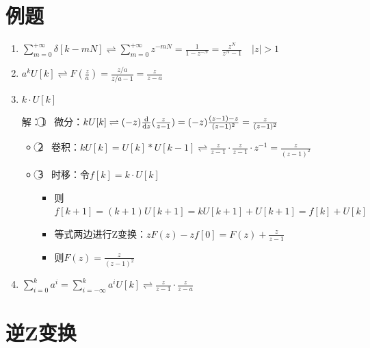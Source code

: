 \documentclass[UTF8]{ctexart}
\begin{document}
\section{例题}
\begin{enumerate}[label=(\arabic*),itemindent=0pt,labelindent=\parindent,labelwidth=2em,labelsep=5pt,leftmargin=*]
  \item $\sum_{m=0}^{+\infty}\delta[k-mN]\rightleftharpoons\sum_{m=0}^{+\infty}z^{-mN}=\frac{1}{1-z^{-N}}=\frac{z^N}{z^N-1}\quad |z|>1$
  \item $a^kU[k]\rightleftharpoons F(\frac{z}{a})=\frac{z/a}{z/a-1}=\frac{z}{z-a}$
  \item $k\cdot U[k]$ \par
        解：\textcircled{1} \ 微分：$kU[k]\rightleftharpoons(-z)\frac{{\rm d}}{{\rm d}z}(\frac{z}{z-1})=(-z)\frac{(z-1)-z}{(z-1)^2}=\frac{z}{(z-1)^2}$
        \begin{itemize}[label=,left=1.5em]
          \item \textcircled{2} \ 卷积：$kU[k]=U[k]*U[k-1]\rightleftharpoons\frac{z}{z-1}\cdot\frac{z}{z-1}\cdot z^{-1}=\frac{z}{(z-1)^2}$
          \item \textcircled{3} \ 时移：令$f[k]=k\cdot U[k]$
                \begin{itemize}[label=,left=4.2em]
                  \item 则$f[k+1]=(k+1)U[k+1]=kU[k+1]+U[k+1]=f[k]+U[k]$
                  \item 等式两边进行Z变换：$zF(z)-zf[0]=F(z)+\frac{z}{z-1}$
                  \item 则$F(z)=\frac{z}{(z-1)^2}$
                \end{itemize}
        \end{itemize}
  \item $\sum_{i=0}^{k}a^i=\sum_{i=-\infty}^{k}a^iU[k]\rightleftharpoons\frac{z}{z-1}\cdot\frac{z}{z-a}$
\end{enumerate}\par

\section{逆Z变换}
\end{document}
